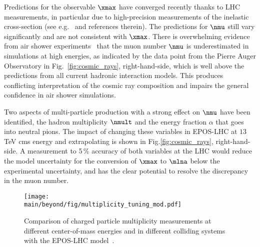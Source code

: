 \documentclass[../report.tex]{subfiles}
\providecommand{\main}{..}
\begin{document}
Predictions for the observable $\xmax$ have converged recently thanks to LHC measurements, in particular due to high-precision measurements of the inelastic cross-section (see e.g.~\cite{Aaij:2018okq} and references therein). The predictions for $\nmu$ still vary significantly and are not consistent with $\xmax$. There is overwhelming evidence from air shower experiments~\cite{Aab:2014pza,Dembinski:2017zkb,Kokoulin:2009zz,AbuZayyad:1999xa,Aab:2014dua} that the muon number $\nmu$ is underestimated in simulations at high energies, as indicated by the data point from the Pierre Auger Observatory in Fig.~\ref{fig:cosmic_rays}, right-hand-side, which is well above the predictions from all current hadronic interaction models. This produces conflicting interpretation of the cosmic ray composition and impairs the general confidence in air shower simulations.



Two aspects of multi-particle production with a strong effect on $\nmu$ have been identified, the hadron multiplicity $\nmult$ and the energy fraction $\alpha$ that goes into neutral pions. The impact of changing these variables in EPOS-LHC at $13$\,TeV cms energy and extrapolating is shown in Fig.\ref{fig:cosmic_rays}, right-hand-side. A measurement to 5\,\% accuracy of both variables at the LHC would reduce the model uncertainty for the conversion of $\xmax$ to $\mlna$ below the experimental uncertainty, and has the clear potential to resolve the discrepancy in the muon number.

\begin{figure}
\texttt{[image: \\main/beyond/fig/multiplicity\_tuning\_mod.pdf]}
\caption{Comparison of charged particle multiplicity measurements at different center-of-mass energies and in different colliding systems with the EPOS-LHC model~\cite{Kim:2018ink}.}
\label{fig:multiplicity_tuning}
\end{figure}
\end{document}
